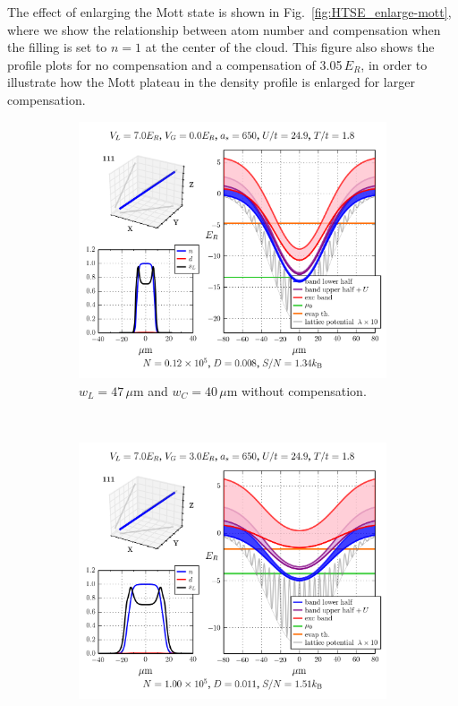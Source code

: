 \documentclass[11pt,letter]{article}
\begin{document}
The effect of enlarging the Mott state is shown in
Fig.~\ref{fig:HTSE_enlarge-mott}, where we show the relationship between atom
number and compensation when the filling is set to $n=1$ at the center of the
cloud. This figure also shows the profile plots for no compensation and a
compensation of 3.05\,$E_{R}$,  in order to illustrate how the Mott plateau in
the density profile is enlarged for larger compensation.  
\begin{figure}
        \centering
        \begin{subfigure}[t]{0.32\textwidth}
		\includegraphics[width=\textwidth]{figures/ir47-gr40_7Er-comp0p0.png}
\caption{$w_{L}=47\,\mu$m and $w_{C}=40\,\mu$m without compensation.  }
                \label{fig:HTSE_enlarge-mott_a}
        \end{subfigure}%
        ~ %
        \begin{subfigure}[t]{0.32\textwidth}
                \includegraphics[width=\textwidth]{figures/ir47-gr40_7Er-comp3p05.png}

\end{subfigure}
\end{figure}
\end{document}
